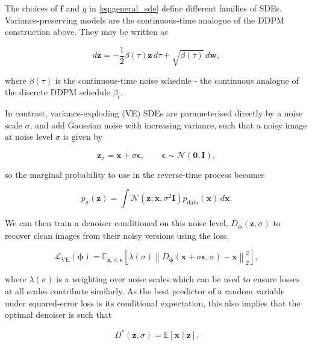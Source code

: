 The choices of $\mathbf{f}$ and $g$ in \eqref{eq:general_sde} define different families of SDEs. Variance-preserving models are the continuous-time analogue of the DDPM construction above. They may be written as

\begin{equation}
d\mathbf{z}=-\frac{1}{2}\beta(\tau)\mathbf{z}\,d\tau+\sqrt{\beta(\tau)}\,d\mathbf{w},
\label{eq:vp_sde}
\end{equation}

where $\beta(\tau)$ is the continuous-time noise schedule - the continuous analogue of the discrete DDPM schedule $\beta_t$.

In contrast, variance-exploding (VE) SDEs are parameterised directly by a noise scale $\sigma$, and add Gaussian noise with increasing variance, such that a noisy image at noise level $\sigma$ is given by

\begin{equation}
\mathbf{z}_\sigma=\mathbf{x}+\sigma\boldsymbol{\epsilon}, \qquad \boldsymbol{\epsilon}\sim\mathcal{N}(\mathbf{0},\mathbf{I}),
\label{eq:ve_noisy_image}
\end{equation}

so the marginal probability to use in the reverse-time process becomes

\begin{equation}
p_\sigma(\mathbf{z})=\int \mathcal{N}(\mathbf{z};\mathbf{x},\sigma^2\mathbf{I})p_{\mathrm{data}}(\mathbf{x})\,d\mathbf{x}.
\label{eq:ve_marginal}
\end{equation}

We can then train a denoiser conditioned on this noise level, $D_{\boldsymbol{\phi}}(\mathbf{z}, \sigma)$ to recover clean images from their noisy versions using the loss,

\begin{equation}
\mathcal L_{\mathrm{VE}}(\boldsymbol{\phi})=
\mathbb E_{\mathbf{x},\sigma,\boldsymbol{\epsilon}}
\left[
\lambda(\sigma)
\left\|D_{\boldsymbol{\phi}}(\mathbf{x}+\sigma\boldsymbol{\epsilon},\sigma)-\mathbf{x}\right\|_2^2
\right],
\label{eq:ve_denoising_loss}
\end{equation}

where $\lambda(\sigma)$ is a weighting over noise scales which can be used to ensure losses at all scales contribute similarly. As the best predictor of a random variable under squared-error loss is its conditional expectation, this also implies that the optimal denoiser is such that

\begin{equation}
D^*(\mathbf{z},\sigma)=\mathbb E[\mathbf{x}\mid \mathbf{z}].
\label{eq:optimal_denoiser_conditional_mean}
\end{equation}

